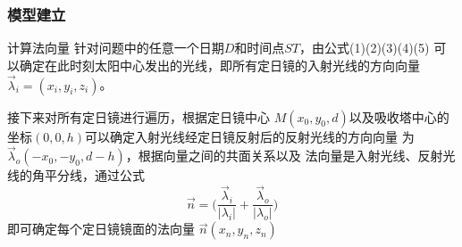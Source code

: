 \documentclass[../main.tex]{subfiles}
\begin{document}
%
%
% 
% 
%


\subsubsection{模型建立}
计算法向量
针对问题中的任意一个日期\(D\)和时间点\(ST\)，由公式(1)(2)(3)(4)(5)
可以确定在此时刻太阳中心发出的光线，即所有定日镜的入射光线的方向向量\(\vec \lambda_i=(x_i,y_i,z_i)\)。

接下来对所有定日镜进行遍历，根据定日镜中心
\(M(x_0,y_0,d)\)以及吸收塔中心的坐标\((0,0,h)\)可以确定入射光线经定日镜反射后的反射光线的方向向量
为 \(\vec \lambda_o (−x_0,−y_0, d −h)\)，根据向量之间的共面关系以及
法向量是入射光线、反射光线的角平分线，通过公式
\begin{equation}
\vec n = \big(\frac{\vec \lambda_{i}}{\vert \lambda_{i} \vert} + \frac{\vec \lambda_{o}}{\vert \lambda_{o} \vert}\big)
\end{equation}
即可确定每个定日镜镜面的法向量 \(\vec n (x_{n}, y_{n}, z_{n})\)
\end{document}
